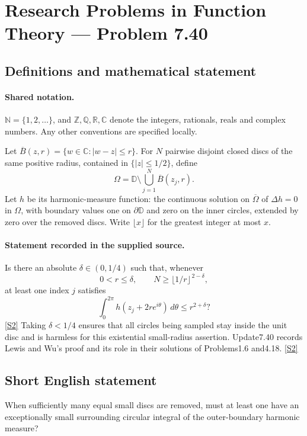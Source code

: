 \documentclass[11pt]{article}
\newcommand{\sref}[2]{\hyperlink{source:#1:#2}{[S#2]}}
\begin{document}
\section{Research Problems in Function Theory — Problem 7.40}\label{statement}

\subsection{Definitions and mathematical statement}

\paragraph{Shared notation.}$\mathbb N=\{1,2,\ldots\}$, and $\mathbb Z,\mathbb Q,\mathbb R,\mathbb C$ denote the integers, rationals, reals and complex numbers. Any other conventions are specified locally.


Let $\overline B(z,r)=\{w\in\mathbb C:|w-z|\le r\}$. For $N$ pairwise disjoint closed discs of the same positive radius, contained in $\{|z|\le1/2\}$, define
\[\Omega=\mathbb D\setminus\bigcup_{j=1}^N\overline B(z_j,r).\]
Let $h$ be its harmonic-measure function: the continuous solution on $\overline\Omega$ of $\Delta h=0$ in $\Omega$, with boundary values one on $\partial\mathbb D$ and zero on the inner circles, extended by zero over the removed discs. Write $\lfloor x\rfloor$ for the greatest integer at most $x$.

\paragraph{Statement recorded in the supplied source.}
Is there an absolute $\delta\in(0,1/4)$ such that, whenever
\[0<r\le\delta,\qquad N\ge\lfloor1/r\rfloor^{\,2-\delta},\]
at least one index $j$ satisfies
\[\int_0^{2\pi}h(z_j+2re^{i\theta})\,d\theta\le r^{2+\delta}?\] \sref{statement}{2}
Taking $\delta<1/4$ ensures that all circles being sampled stay inside the unit disc and is harmless for this existential small-radius assertion. Update7.40 records Lewis and Wu's proof and its role in their solutions of Problems1.6 and4.18. \sref{statement}{2}
\subsection{Short English statement}
When sufficiently many equal small discs are removed, must at least one have an exceptionally small surrounding circular integral of the outer-boundary harmonic measure?
\end{document}
